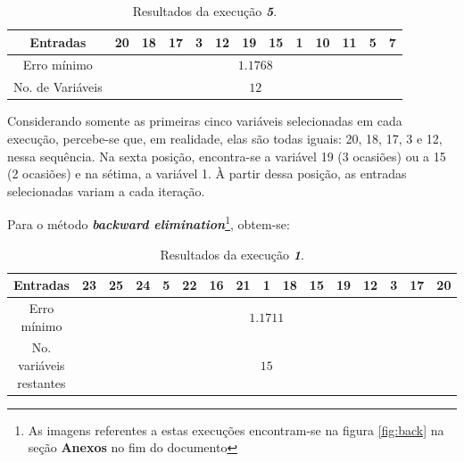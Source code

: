 \begin{enumerate}
\begin{enumerate}
\begin{table}[H]
\begin{tabular}{|c | c | c | c | c | c | c | c | c | c | c | c | c | c | c
					| c|}
					\end{tabular}	    
			    \end{table} 
			    
		\vspace{-12pt}

			\begin{table}[H]
				    \centering
				    \footnotesize
					\caption{\label{tab:forward5_sunspot} Resultados da execução
					\textit{\textbf{5}}.}
				    \vspace{-6pt}
					\begin{tabular}{|c | c | c | c | c | c | c | c | c | c | c | c | c|}
					\hline
					Entradas & 20 & 18 & 17 & 3 & 12 & 19 & 15 & 1 & 10 & 11 & 5 & 7 \\
					\hline
					Erro mínimo & \multicolumn{12}{c|}{\(1.1768\)}  \\ \hline
					No. de Variáveis & \multicolumn{12}{c|}{\(12\)}  \\
					\hline
					
					\end{tabular}	    
			    \end{table} 
	
			    \FloatBarrier
	
		Considerando somente as primeiras cinco variáveis selecionadas em cada execução,
		percebe-se que, em realidade, elas são todas iguais: 20, 18, 17, 3 e 12, nessa
		sequência. Na sexta posição, encontra-se a variável 19 (3 ocasiões) ou a 15 (2
		ocasiões) e na sétima, a variável 1. À partir dessa posição, as entradas
		selecionadas variam a cada iteração.
		
		\vspace{12pt}	
	
		Para o método \textbf{\textit{backward elimination}}\footnote{As
			imagens referentes a estas execuções encontram-se na figura \ref{fig:back}
			na seção \textbf{Anexos} no fim do documento}, obtem-se:
			
			\begin{table}[H]
				    \centering
				    \footnotesize
					\caption{\label{tab:backward1_sunspot} Resultados da execução
					\textit{\textbf{1}}.}
				    \vspace{-6pt}
					\begin{tabular}{|c | c | c | c | c | c | c | c | c | c | c | c | c | c | c |
					c|}
					\hline
					Entradas & 23 & 25 & 24 & 5 & 22 & 16 & 21 & 1 & 18 & 15 & 19 & 12 & 3 & 17 & 20  \\
					\hline
					Erro mínimo & \multicolumn{15}{c|}{\(1.1711\)}  \\ \hline
					No. variáveis restantes & \multicolumn{15}{c|}{\(15\)}  \\
					\hline
					

\end{tabular}
\end{table}
\end{enumerate}
\end{enumerate}

